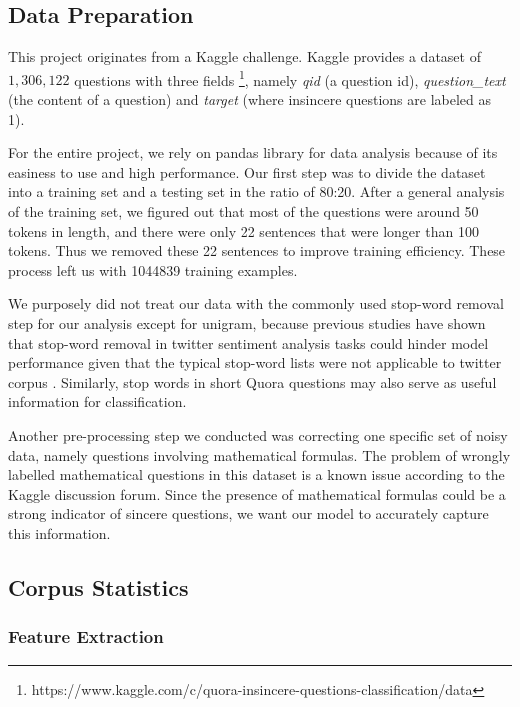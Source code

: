 \documentclass[12pt]{diazessay} %
\begin{document}
\subsection{Data Preparation} \label{data}
This project originates from a Kaggle challenge. Kaggle provides a dataset of $1,306,122$ questions with three fields \footnote{https://www.kaggle.com/c/quora-insincere-questions-classification/data}, namely \textit{qid} (a question id), \textit{question\_text} (the content of a question) and \textit{target} (where insincere questions are labeled as 1). 

For the entire project, we rely on pandas library for data analysis because of its easiness to use and high performance. Our first step was to divide the dataset into a training set and a testing set in the ratio of 80:20. After a general analysis of the training set, we figured out that most of the questions were around 50 tokens in length, and there were only 22 sentences that were longer than 100 tokens. Thus we removed these 22 sentences to improve training efficiency. These process left us with \num[group-separator={,}]{1044839} training examples. 

We purposely did not treat our data with the commonly used stop-word removal step for our analysis except for unigram, because previous studies have shown that stop-word removal in twitter sentiment analysis tasks could hinder model performance given that the typical stop-word lists were not applicable to twitter corpus \citep{giachanou2016}. Similarly, stop words in short Quora questions may also serve as useful information for classification. 

Another pre-processing step we conducted was correcting one specific set of noisy data, namely questions involving mathematical formulas. The problem of wrongly labelled mathematical questions in this dataset is a known issue according to the Kaggle discussion forum. Since the presence of mathematical formulas could be a strong indicator of sincere questions, we want our model to accurately capture this information.

\subsection{Corpus Statistics} \label{corpus-stats}

\subsubsection{Feature Extraction}
\end{document}

